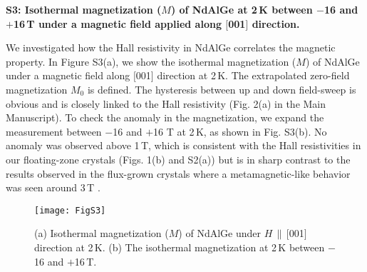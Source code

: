 \documentclass[%
preprint,
 amsmath,amssymb,
 aps,
]{revtex4-2}
\begin{document}
\clearpage


\hspace{-7 mm}
\textbf{S3: Isothermal magnetization ($M$) of NdAlGe at 2\,K between $-$16 and $+$16\,T under a magnetic field applied along $\lbrack$001$\rbrack$ direction. }

%
We investigated how the Hall resistivity in NdAlGe correlates the magnetic property. 
%
In Figure S3(a), we show the isothermal magnetization ($M$) of NdAlGe under a magnetic field 
along $\lbrack$001$\rbrack$ direction at 2\,K. 
%
The extrapolated zero-field magnetization $M_{0}$ is defined. 
%
The hysteresis between up and down field-sweep is obvious and is closely linked 
to the Hall resistivity (Fig. 2(a) in the Main Manuscript). 
%
To check the anomaly in the magnetization, we expand the measurement between $-$16 and $+$16 T 
at 2\,K, as shown in Fig. S3(b). 
%
No anomaly was observed above 1\,T, 
which is consistent with the Hall resistivities in our floating-zone crystals (Figs. 1(b) and S2(a)) 
but is in sharp contrast to the results observed in the flux-grown crystals 
where a metamagnetic-like behavior was seen around 3\,T 
\cite{Zhao_NewJPhys_2022_SM,Yang_PhysRevMater_2023_SM,Cho_SSRN_2022_SM,Dhital_PhyrevB_2023_SM}. 
%

%
\begin{figure}[h]
\texttt{[image: FigS3]}%
\caption{
(a) Isothermal magnetization ($M$) of NdAlGe under $H$\,$\parallel$\,$\lbrack$001$\rbrack$ 
direction at 2\,K. 
(b) The isothermal magnetization at 2\,K between $-$16 and $+$16\,T.
}
\end{figure}

\clearpage


\end{document}
